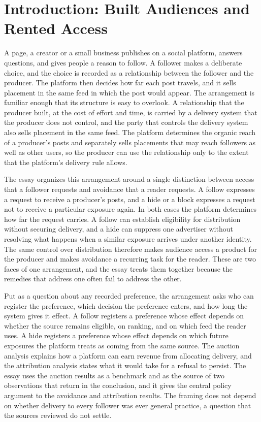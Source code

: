 \documentclass[11pt]{article}
\theoremstyle{definition}
\begin{document}
\section{Introduction: Built Audiences and Rented Access}

A page, a creator or a small business publishes on a social platform, answers questions, and gives people a reason to follow. A follower makes a deliberate choice, and the choice is recorded as a relationship between the follower and the producer. The platform then decides how far each post travels, and it sells placement in the same feed in which the post would appear. The arrangement is familiar enough that its structure is easy to overlook. A relationship that the producer built, at the cost of effort and time, is carried by a delivery system that the producer does not control, and the party that controls the delivery system also sells placement in the same feed. The platform determines the organic reach of a producer's posts and separately sells placements that may reach followers as well as other users, so the producer can use the relationship only to the extent that the platform's delivery rule allows.

The essay organizes this arrangement around a single distinction between access that a follower requests and avoidance that a reader requests. A follow expresses a request to receive a producer's posts, and a hide or a block expresses a request not to receive a particular exposure again. In both cases the platform determines how far the request carries. A follow can establish eligibility for distribution without securing delivery, and a hide can suppress one advertiser without resolving what happens when a similar exposure arrives under another identity. The same control over distribution therefore makes audience access a product for the producer and makes avoidance a recurring task for the reader. These are two faces of one arrangement, and the essay treats them together because the remedies that address one often fail to address the other.

Put as a question about any recorded preference, the arrangement asks who can register the preference, which decision the preference enters, and how long the system gives it effect. A follow registers a preference whose effect depends on whether the source remains eligible, on ranking, and on which feed the reader uses. A hide registers a preference whose effect depends on which future exposures the platform treats as coming from the same source. The auction analysis explains how a platform can earn revenue from allocating delivery, and the attribution analysis states what it would take for a refusal to persist. The essay uses the auction results as a benchmark and as the source of two observations that return in the conclusion, and it gives the central policy argument to the avoidance and attribution results. The framing does not depend on whether delivery to every follower was ever general practice, a question that the sources reviewed do not settle.
\end{document}
